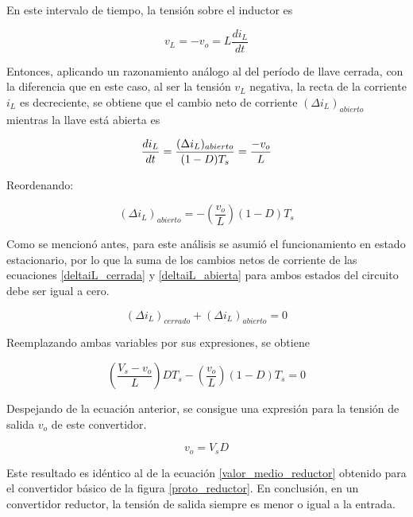 En este intervalo de tiempo, la tensión sobre el inductor es

\begin{equation}\label{ec_tensionL_abierta}
    v_L = -v_o = L\frac{di_L}{dt}
\end{equation}

Entonces, aplicando un razonamiento análogo al del período de llave cerrada, con la diferencia que en este caso, al ser la tensión $v_L$ negativa, la recta de la corriente $i_L$ es decreciente, se obtiene que el cambio neto de corriente $(\Delta i_L)_{abierto}$ mientras la llave está abierta es

\begin{equation*}
    \frac{di_L}{dt} = \frac{(\Delta i_L)_{abierto}}{(1-D)T_s} = \frac{-v_o}{L}\\
\end{equation*}

Reordenando:

\begin{equation}\label{deltaiL_abierta}
    \boxed{
        (\Delta i_L)_{abierto} = -\left(\frac{v_o}{L}\right)(1-D)T_s
    }
\end{equation}

Como se mencionó antes, para este análisis se asumió el funcionamiento en estado estacionario, por lo que la suma de los cambios netos de corriente de las ecuaciones \ref{deltaiL_cerrada} y \ref{deltaiL_abierta} para ambos estados del circuito debe ser igual a cero.

\begin{equation}
    (\Delta i_L)_{cerrado} + (\Delta i_L)_{abierto} = 0
\end{equation}

Reemplazando ambas variables por sus expresiones, se obtiene

\begin{equation*}
    \left(\frac{V_s - v_o}{L}\right)DT_s - \left(\frac{v_o}{L}\right)(1-D)T_s  = 0
\end{equation*}

Despejando de la ecuación anterior, se consigue una expresión para la tensión de salida $v_o$ de este convertidor.

\begin{equation}\label{vo_reductor}
    \boxed{
        v_o = V_sD
    }
\end{equation}

Este resultado es idéntico al de la ecuación \ref{valor_medio_reductor} obtenido para el convertidor básico de la figura \ref{proto_reductor}. En conclusión, {\Medium en un convertidor reductor, la tensión de salida siempre es menor o igual a la entrada}.\\

